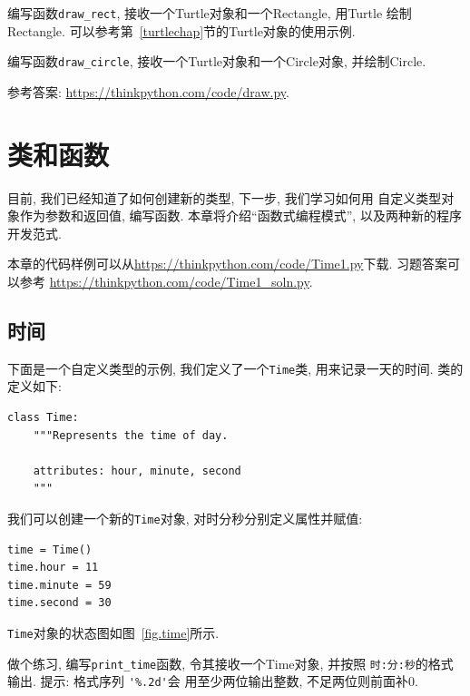 \documentclass[10pt]{book}
\begin{document}
\begin{exercise}

编写函数\verb"draw_rect", 接收一个Turtle对象和一个Rectangle, 
用Turtle 绘制Rectangle. 
可以参考第~\ref{turtlechap}节的Turtle对象的使用示例. 

编写函数\verb"draw_circle",  接收一个Turtle对象和一个Circle对象, 并绘制Circle.


参考答案: \url{https://thinkpython.com/code/draw.py}.

\end{exercise}



\chapter{类和函数}
\label{time}

目前, 我们已经知道了如何创建新的类型, 下一步, 我们学习如何用
自定义类型对象作为参数和返回值, 编写函数. 
本章将介绍``函数式编程模式'', 以及两种新的程序开发范式. 


本章的代码样例可以从\url{https://thinkpython.com/code/Time1.py}下载. 
习题答案可以参考
\url{https://thinkpython.com/code/Time1_soln.py}.


\section{时间}
\label{isafter}

下面是一个自定义类型的示例, 我们定义了一个{\tt Time}类, 
用来记录一天的时间. 
类的定义如下: 
 

\begin{verbatim}
class Time:
    """Represents the time of day.
       
    attributes: hour, minute, second
    """
\end{verbatim}
%
我们可以创建一个新的{\tt Time}对象, 
对时分秒分别定义属性并赋值:

\begin{verbatim}
time = Time()
time.hour = 11
time.minute = 59
time.second = 30
\end{verbatim}
%
{\tt Time}对象的状态图如图~\ref{fig.time}所示.

做个练习, 编写\verb"print_time"函数, 令其接收一个Time对象, 并按照
{\tt 时:分:秒}的格式输出. 
提示: 格式序列 \verb"'%.2d'"会
用至少两位输出整数, 不足两位则前面补0. 
\end{document}
